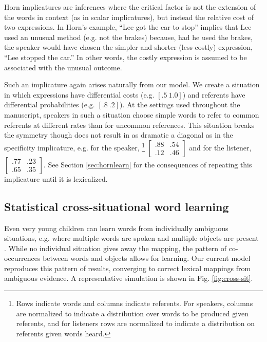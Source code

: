 \documentclass{article} %
\begin{document}
Horn implicatures are inferences where the critical factor is not the extension of the words in context (as in scalar implicatures), but instead the relative cost of two expressions. In Horn's example, ``Lee got the car to stop'' implies that Lee used an unusual method (e.g. not the brakes) because, had he used the brakes, the speaker would have chosen the simpler and shorter (less costly) expression, ``Lee stopped the car.'' In other words, the costly expression is assumed to be associated with the unusual outcome.

Such an implicature again arises naturally from our model. We create a situation in which expressions have differential costs (e.g. $[.5~1.0]$) and referents have differential probabilities (e.g. $[.8~.2]$). At the settings used throughout the manuscript, speakers in such a situation choose simple words to refer to common referents at different rates than for uncommon references. This situation breaks the symmetry though does not result in as dramatic a diagonal as in the specificity implicature, e.g. for the speaker, \footnote{Rows indicate words and columns indicate referents. For speakers, columns are normalized to indicate a distribution over words to be produced given referents, and for listeners rows are normalized to indicate a distribution on referents given words heard.}
$\left[
    \begin{array}{cc}
      .88 & .54 \\
      .12 & .46
    \end{array} 
  \right]$ 
and for the listener,
$\left[
    \begin{array}{cc}
      .77 & .23 \\
      .65 & .35
    \end{array} 
  \right]$. See Section \ref{sec:hornlearn} for the consequences of repeating this implicature until it is lexicalized.


%
%

\subsection{Statistical cross-situational word learning}

Even very young children can learn words from individually ambiguous situations, e.g. where multiple words are spoken and multiple objects are present \cite{smith2008}. While no individual situation gives away the mapping, the pattern of co-occurrences between words and objects allows for learning. Our current model reproduces this pattern of results, converging to correct lexical mappings from ambiguous evidence. A representative simulation is shown in Fig. \ref{fig:cross-sit}.
\end{document}
